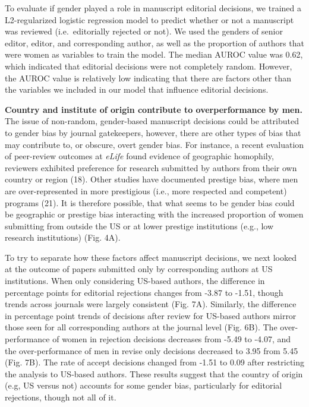 \documentclass[11pt,]{article}
\begin{document}
To evaluate if gender played a role in manuscript editorial decisions,
we trained a L2-regularized logistic regression model to predict whether
or not a manuscript was reviewed (i.e.~editorially rejected or not). We
used the genders of senior editor, editor, and corresponding author, as
well as the proportion of authors that were women as variables to train
the model. The median AUROC value was 0.62, which indicated that
editorial decisions were not completely random. However, the AUROC value
is relatively low indicating that there are factors other than the
variables we included in our model that influence editorial decisions.

\textbf{Country and institute of origin contribute to overperformance by
men.} The issue of non-random, gender-based manuscript decisions could
be attributed to gender bias by journal gatekeepers, however, there are
other types of bias that may contribute to, or obscure, overt gender
bias. For instance, a recent evaluation of peer-review outcomes at
\emph{eLife} found evidence of geographic homophily, reviewers exhibited
preference for research submitted by authors from their own country or
region (18). Other studies have documented prestige bias, where men are
over-represented in more prestigious (i.e., more respected and
competent) programs (21). It is therefore possible, that what seems to
be gender bias could be geographic or prestige bias interacting with the
increased proportion of women submitting from outside the US or at lower
prestige institutions (e.g., low research institutions) (Fig. 4A).

To try to separate how these factors affect manuscript decisions, we
next looked at the outcome of papers submitted only by corresponding
authors at US institutions. When only considering US-based authors, the
difference in percentage points for editorial rejections changes from
-3.87 to -1.51, though trends across journals were largely consistent
(Fig. 7A). Similarly, the difference in percentage point trends of
decisions after review for US-based authors mirror those seen for all
corresponding authors at the journal level (Fig. 6B). The
over-performance of women in rejection decisions decreases from -5.49 to
-4.07, and the over-performance of men in revise only decisions
decreased to 3.95 from 5.45 (Fig. 7B). The rate of accept decisions
changed from -1.51 to 0.09 after restricting the analysis to US-based
authors. These results suggest that the country of origin (e.g, US
versus not) accounts for some gender bias, particularly for editorial
rejections, though not all of it.
\end{document}
